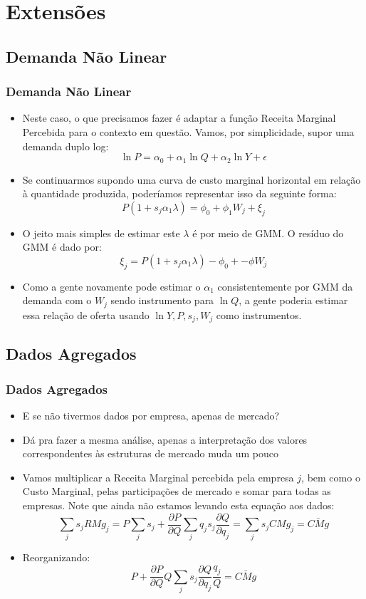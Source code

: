 \documentclass{beamer}
\begin{document}
\section{Extensões}

\subsection{Demanda Não Linear}
\begin{frame}\frametitle{Demanda Não Linear}
\small
\begin{itemize}
\item Neste caso, o que precisamos fazer é adaptar a função
Receita Marginal Percebida para o contexto em questão. Vamos, por
simplicidade, supor uma demanda duplo log:
\[
\ln P=\alpha_{0}+\alpha_{1}\ln Q+\alpha_{2}\ln Y+\epsilon
\]
\item Se continuarmos supondo uma curva de custo marginal
horizontal em relação à quantidade produzida, poderíamos representar
isso da seguinte forma:
\[
P\left(1+s_{j}\alpha_{1}\lambda\right)=\phi_{0}+\phi_{1}W_{j}+\xi_{j}
\]
\item O jeito mais simples de estimar este $\lambda$ é
por meio de GMM. O resíduo do GMM é dado por:
\[
\xi_{j}=P\left(1+s_{j}\alpha_{1}\lambda\right)-\phi_{0}+-\phi W_{j}
\]
\item Como a gente novamente pode estimar o $\alpha_{1}$
consistentemente por GMM da demanda com o $W_{j}$ sendo instrumento
para $\ln Q$, a gente poderia estimar essa relação de oferta usando
$\ln Y,P,s_{j},W_{j}$ como instrumentos.
\end{itemize}
\end{frame}


\subsection{Dados Agregados}
\begin{frame}\frametitle{Dados Agregados}

\begin{itemize}
\item E se não tivermos dados por empresa, apenas de mercado?
\item Dá pra fazer a mesma análise, apenas a interpretação dos valores correspondentes
às estruturas de mercado muda um pouco
\item Vamos multiplicar a Receita Marginal percebida pela empresa $j$,
bem como o Custo Marginal, pelas participações de mercado e somar
para todas as empresas. Note que ainda não estamos levando esta equação
aos dados:
\[
\sum_{j}s_{j}RMg_{j}=P\sum_{j}s_{j}+\frac{\partial P}{\partial Q}\sum_{j}q_{j}s_{j}\frac{\partial Q}{\partial q_{j}}=\sum_{j}s_{j}CMg_{j}=\bar{CMg}
\]
\item Reorganizando:
\[
P+\frac{\partial P}{\partial Q}Q\sum_{j}s_{j}\frac{\partial Q}{\partial q_{j}}\frac{q_{j}}{Q}=\bar{CMg}
\]
\end{itemize}
\end{frame}
\end{document}
